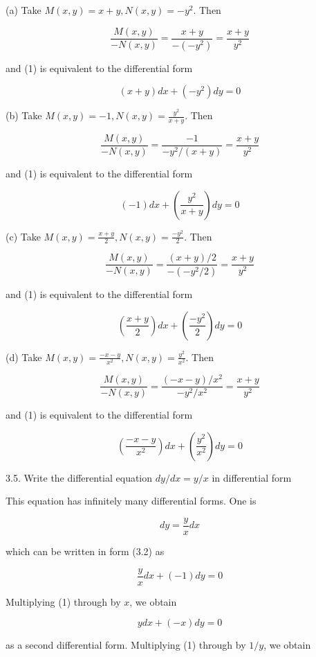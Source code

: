\documentclass[10pt]{article}
\begin{document}
(a) Take $M(x, y)=x+y, N(x, y)=-y^{2}$. Then

$$
\frac{M(x, y)}{-N(x, y)}=\frac{x+y}{-\left(-y^{2}\right)}=\frac{x+y}{y^{2}}
$$

and (1) is equivalent to the differential form

$$
(x+y) d x+\left(-y^{2}\right) d y=0
$$

(b) Take $M(x, y)=-1, N(x, y)=\frac{y^{2}}{x+y}$. Then

$$
\frac{M(x, y)}{-N(x, y)}=\frac{-1}{-y^{2} /(x+y)}=\frac{x+y}{y^{2}}
$$

and (1) is equivalent to the differential form

$$
(-1) d x+\left(\frac{y^{2}}{x+y}\right) d y=0
$$

(c) Take $M(x, y)=\frac{x+y}{2}, N(x, y)=\frac{-y^{2}}{2}$. Then

$$
\frac{M(x, y)}{-N(x, y)}=\frac{(x+y) / 2}{-\left(-y^{2} / 2\right)}=\frac{x+y}{y^{2}}
$$

and (1) is equivalent to the differential form

$$
\left(\frac{x+y}{2}\right) d x+\left(\frac{-y^{2}}{2}\right) d y=0
$$

(d) Take $M(x, y)=\frac{-x-y}{x^{2}}, N(x, y)=\frac{y^{2}}{x^{2}}$. Then

$$
\frac{M(x, y)}{-N(x, y)}=\frac{(-x-y) / x^{2}}{-y^{2} / x^{2}}=\frac{x+y}{y^{2}}
$$

and (1) is equivalent to the differential form

$$
\left(\frac{-x-y}{x^{2}}\right) d x+\left(\frac{y^{2}}{x^{2}}\right) d y=0
$$

3.5. Write the differential equation $d y / d x=y / x$ in differential form

This equation has infinitely many differential forms. One is

$$
d y=\frac{y}{x} d x
$$

which can be written in form (3.2) as


\begin{equation*}
\frac{y}{x} d x+(-1) d y=0 \tag{1}
\end{equation*}


Multiplying (1) through by $x$, we obtain


\begin{equation*}
y d x+(-x) d y=0 \tag{2}
\end{equation*}


as a second differential form. Multiplying (1) through by $1 / y$, we obtain
\end{document}
